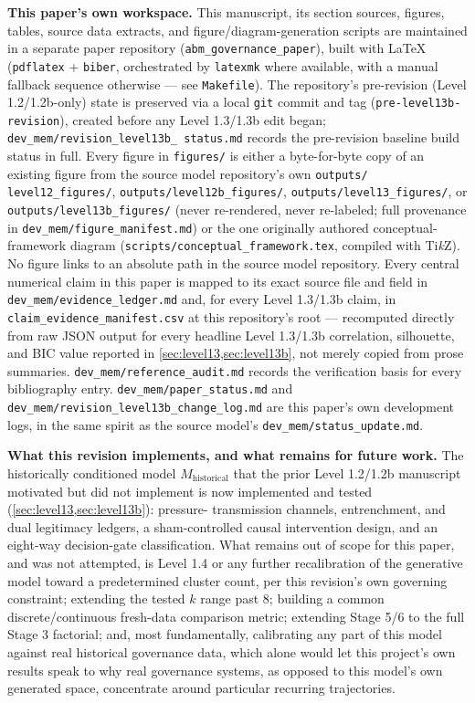 \textbf{This paper's own workspace.} This manuscript, its section sources,
figures, tables, source data extracts, and figure/diagram-generation
scripts are maintained in a separate paper repository
(\texttt{abm\_governance\_paper}), built with \LaTeX{} (\texttt{pdflatex}
+ \texttt{biber}, orchestrated by \texttt{latexmk} where available, with a
manual fallback sequence otherwise --- see \texttt{Makefile}). The
repository's pre-revision (Level 1.2/1.2b-only) state is preserved via a
local \texttt{git} commit and tag (\texttt{pre-level13b-revision}), created
before any Level 1.3/1.3b edit began; \texttt{dev\_mem/revision\_level13b\_%
status.md} records the pre-revision baseline build status in full. Every
figure in \texttt{figures/} is either a byte-for-byte copy of an existing
figure from the source model repository's own \texttt{outputs/%
level12\_figures/}, \texttt{outputs/level12b\_figures/},
\texttt{outputs/level13\_figures/}, or \texttt{outputs/level13b\_figures/}
(never re-rendered, never re-labeled; full provenance in
\texttt{dev\_mem/figure\_manifest.md}) or the one originally authored
conceptual-framework diagram (\texttt{scripts/conceptual\_framework.tex},
compiled with Ti\textit{k}Z). No figure links to an absolute path in the
source model repository. Every central numerical claim in this paper is
mapped to its exact source file and field in
\texttt{dev\_mem/evidence\_ledger.md} and, for every Level 1.3/1.3b claim,
in \texttt{claim\_evidence\_manifest.csv} at this repository's root ---
recomputed directly from raw JSON output for every headline Level 1.3/1.3b
correlation, silhouette, and BIC value reported in
\cref{sec:level13,sec:level13b}, not merely copied from prose summaries.
\texttt{dev\_mem/reference\_audit.md} records the verification basis for
every bibliography entry. \texttt{dev\_mem/paper\_status.md} and
\texttt{dev\_mem/revision\_level13b\_change\_log.md} are this paper's own
development logs, in the same spirit as the source model's
\texttt{dev\_mem/status\_update.md}.

\textbf{What this revision implements, and what remains for future work.}
The historically conditioned model $M_{\text{historical}}$ that the prior
Level 1.2/1.2b manuscript motivated but did not implement is now
implemented and tested (\cref{sec:level13,sec:level13b}): pressure-
transmission channels, entrenchment, and dual legitimacy ledgers, a
sham-controlled causal intervention design, and an eight-way decision-gate
classification. What remains out of scope for this paper, and was not
attempted, is Level 1.4 or any further recalibration of the generative
model toward a predetermined cluster count, per this revision's own
governing constraint; extending the tested $k$ range past 8; building a
common discrete/continuous fresh-data comparison metric; extending Stage
5/6 to the full Stage 3 factorial; and, most fundamentally, calibrating
any part of this model against real historical governance data, which
alone would let this project's own results speak to why real governance
systems, as opposed to this model's own generated space, concentrate
around particular recurring trajectories.
